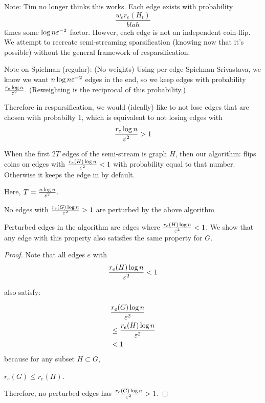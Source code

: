 


Note: Tim no longer thinks this works. Each edge exists with probability 
\[ \frac{w_e r_e(H_t)}{blah} \]
  times some $\log n \varepsilon^{-2}$ factor. Howver, each edge is not an
  independent coin-flip.
We attempt to recreate semi-streaming sparsification (knowing now that
    it's possible) without the general framework of resparsification.

Note on Spielman (regular):
  (No weights) Using per-edge Spielman Srivastava, we know we want $n \log n
  \varepsilon^{-2}$ edges in the end, so we keep edges with probability
  $\frac{r_e \log n}{\varepsilon^2}$. (Reweighting is the reciprocal of this
      probability.)

Therefore in resparsification, we would (ideally) like to not lose edges
that are chosen with probabilty $1$, which is equivalent to not losing
edges with
\begin{align}
& \frac{r_e \log n}{\varepsilon^2}  > 1
\\ 
\end{align}


When the first $2T$ edges of the semi-stream is graph $H$, then our algorithm: flips coins
on edges with $\frac{r_e(H) \log n}{\varepsilon^2} < 1$ with probability
equal to that number. Otherwise it keeps the edge in by default. 

Here, $T = \frac{n \log n}{\varepsilon^2}$.

\begin{lemma}

No edges with $\frac{r_e(G) \log n}{\varepsilon^2} > 1$ are
perturbed by the above algorithm
\end{lemma}

Perturbed edges in the algorithm are edges where $\frac{r_e(H) \log n}{\varepsilon^2} < 1$.
We show that any edge with this property also satisfies the same
property for $G$.
\begin{proof}
Note that all edges $e$ with 
\begin{align*}
\frac{r_e(H) \log n}{\varepsilon^2} < 1
\end{align*}

also satisfy:

\begin{align*}
& \frac{r_e(G) \log n}{\varepsilon^2}
\\
& \leq \frac{r_e(H) \log n}{\varepsilon^2}
\\ 
&< 1
\end{align*}
because for any subset $H \subset G$,

$r_e(G) \leq r_e(H)$.

Therefore, no perturbed edges has $\frac{r_e(G) \log n}{\varepsilon^2} > 1$.

\end{proof}

